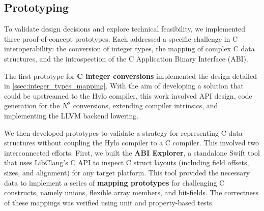 \subsection{Prototyping}
To validate design decisions and explore technical feasibility, we implemented three proof-of-concept prototypes. Each addressed a specific challenge in C interoperability: the conversion of integer types, the mapping of complex C data structures, and the introspection of the C Application Binary Interface (ABI).

The first prototype for \textbf{C integer conversions} implemented the design detailed in \autoref{ssec:integer_types_mapping}. With the aim of developing a solution that could be upstreamed to the Hylo compiler, this work involved API design, code generation for the $N^2$ conversions, extending compiler intrinsics, and implementing the LLVM backend lowering.

We then developed prototypes to validate a strategy for representing C data structures without coupling the Hylo compiler to a C compiler. This involved two interconnected efforts. First, we built the \textbf{ABI Explorer}, a standalone Swift tool that uses LibClang's C API to inspect C struct layouts (including field offsets, sizes, and alignment) for any target platform. This tool provided the necessary data to implement a series of \textbf{mapping prototypes} for challenging C constructs, namely unions\cite{hylo-union-mapping}, flexible array members\cite{hylo-fam-mapping}, and bit-fields\cite{hylo-bit-field-mapping}. The correctness of these mappings was verified using unit and property-based tests.